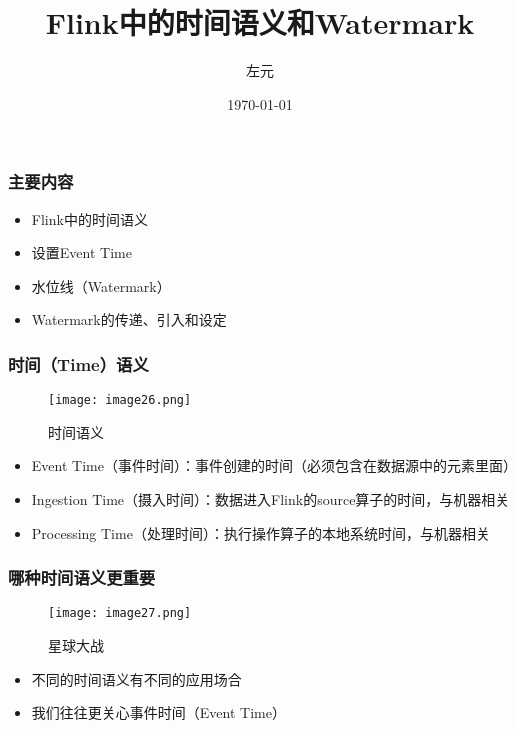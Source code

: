 \documentclass{beamer}
\title{Flink中的时间语义和Watermark}
\date{\today}
\author{左元}
\institute{尚硅谷 大数据组}
\begin{document}
  \maketitle
  \begin{frame}
    \frametitle{主要内容}

    \begin{itemize}
        \item Flink中的时间语义
        \item 设置Event Time
        \item 水位线（Watermark）
        \item Watermark的传递、引入和设定
    \end{itemize}
  
  \end{frame}

  \begin{frame}
      \frametitle{时间（Time）语义}

      \begin{figure}
        \centering
        \texttt{[image: image26.png]}
        \caption{时间语义}
      \end{figure}
  
      \begin{itemize}
          \item Event Time（事件时间）：事件创建的时间（必须包含在数据源中的元素里面）
          \item Ingestion Time（摄入时间）：数据进入Flink的source算子的时间，与机器相关
          \item Processing Time（处理时间）：执行操作算子的本地系统时间，与机器相关
      \end{itemize}
  
  \end{frame}

  \begin{frame}
      \frametitle{哪种时间语义更重要}

      \begin{figure}
        \centering
        \texttt{[image: image27.png]}
        \caption{星球大战}
      \end{figure}
  
      \begin{itemize}
          \item 不同的时间语义有不同的应用场合
          \item 我们往往更关心事件时间（Event Time）
      \end{itemize}
  
  \end{frame}
\end{document}

